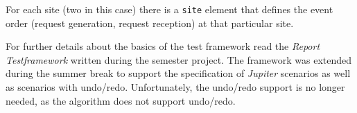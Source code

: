 For each site (two in this case) there is a \texttt{site} element that
defines the event order (request generation, request reception) at that
particular site.

For further details about the basics of the test framework read the 
\emph{Report Testframework} written during the semester project. The framework
was extended during the summer break to support the specification of
\emph{Jupiter} scenarios as well as scenarios with undo/redo. Unfortunately,
the undo/redo support is no longer needed, as the algorithm does not
support undo/redo.

